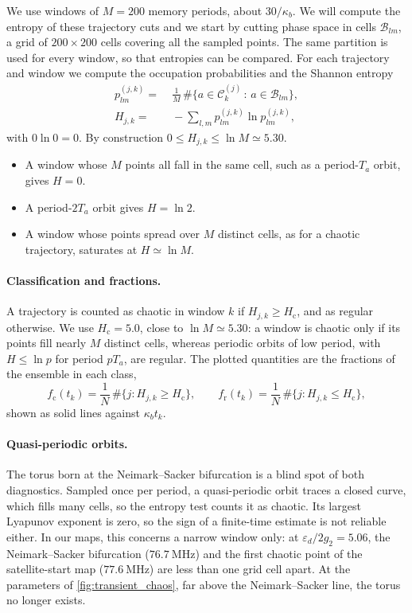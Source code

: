 \documentclass[aps,prx,reprint,floatfix,amsmath,amssymb,longbibliography]{revtex4-2}
\newcommand{\eps}{\varepsilon}
\begin{document}
We use windows of $M=200$ memory periods, about $30/\kappa_b$. We will compute the entropy of these trajectory cuts and we start by cutting phase space in cells $\mathcal{B}_{lm}$, a grid of $200\times200$ cells covering all the sampled points. The same partition is used for every window, so that entropies can be compared. For each trajectory and window we compute the occupation probabilities and the Shannon entropy
\begin{equation}
\begin{split}
    p^{(j,k)}_{lm} =&\; \frac{1}{M}\,\#\bigl\{ a \in \mathcal{C}^{(j)}_k \,:\, a \in \mathcal{B}_{lm} \bigr\},
    \\
    H_{j,k} =&\; -\sum_{l,m} p^{(j,k)}_{lm} \ln p^{(j,k)}_{lm},
\end{split}
\end{equation}
with $0\ln 0 = 0$. By construction $0 \le H_{j,k} \le \ln M \simeq 5.30$.
\begin{itemize}
    \item A window whose $M$ points all fall in the same cell, such as a period-$T_a$ orbit, gives $H = 0$.
    \item A period-$2T_a$ orbit gives $H = \ln 2$.
    \item A window whose points spread over $M$ distinct cells, as for a chaotic trajectory, saturates at $H \simeq \ln M$.
\end{itemize}

\paragraph*{Classification and fractions.}
A trajectory is counted as chaotic in window $k$ if $H_{j,k} \ge H_\text{c}$, and as regular otherwise. We use $H_\text{c}=5.0$, close to $\ln M\simeq5.30$: a window is chaotic only if its points fill nearly $M$ distinct cells, whereas periodic orbits of low period, with $H\le\ln p$ for period $pT_a$, are regular. The plotted quantities are the fractions of the ensemble in each class,
\begin{equation}
    f_\text{c}(t_k) = \frac{1}{N}\,\#\bigl\{ j : H_{j,k} \ge H_\text{c} \bigr\},
    \qquad
    f_\text{r}(t_k) = \frac{1}{N}\,\#\bigl\{ j : H_{j,k} \le H_\text{c} \bigr\},
\end{equation}
shown as solid lines against $\kappa_b t_k$.

\paragraph*{Quasi-periodic orbits.}
The torus born at the Neimark--Sacker bifurcation is a blind spot of both diagnostics. Sampled once per period, a quasi-periodic orbit traces a closed curve, which fills many cells, so the entropy test counts it as chaotic. Its largest Lyapunov exponent is zero, so the sign of a finite-time estimate is not reliable either. In our maps, this concerns a narrow window only: at $\eps_d/2g_2=5.06$, the Neimark--Sacker bifurcation ($76.7~\mathrm{MHz}$) and the first chaotic point of the satellite-start map ($77.6~\mathrm{MHz}$) are less than one grid cell apart. At the parameters of \cref{fig:transient_chaos}, far above the Neimark--Sacker line, the torus no longer exists.
\end{document}
